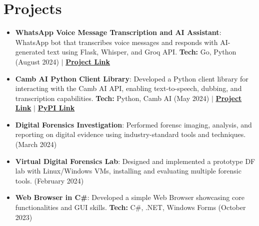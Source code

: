 \documentclass[a4paper,20pt]{article}
\newcommand{\resumeItem}[2] {
	\item\small{
		\textbf{#1}{: #2 \vspace{-2pt}}
	}
}
\newcommand{\resumeSubItem}[2]{\resumeItem{#1}{#2}\vspace{-3pt}}
\newcommand{\resumeSubHeadingListStart}{\begin{itemize}[leftmargin=*]}
\newcommand{\resumeSubHeadingListEnd}{\end{itemize}}
\begin{document}
\section{Projects}
	\resumeSubHeadingListStart
		\resumeSubItem{WhatsApp Voice Message Transcription and AI Assistant}{WhatsApp bot that transcribes voice messages and responds with AI-generated text using Flask, Whisper, and Groq API. \textbf{Tech:} Go, Python (August 2024) $\vert$ \href{https://github.com/cr2007/whatsapp-voice-ai-assistant}{\textbf{Project Link}}}
		\vspace{2pt}
		\resumeSubItem{Camb AI Python Client Library}{Developed a Python client library for interacting with the Camb AI API, enabling text-to-speech, dubbing, and transcription capabilities. \textbf{Tech:} Python, Camb AI (May 2024) $\vert$ \href{https://github.com/cr2007/cambai}{\textbf{Project Link}} $\vert$ \href{https://pypi.org/project/cambai}{\textbf{PyPI Link}}}
		\vspace{2pt}
		\resumeSubItem{Digital Forensics Investigation}{Performed forensc imaging, analysis, and reporting on digital evidence using industry-standard tools and techniques. (March 2024)}
		\vspace{2pt}
		\resumeSubItem{Virtual Digital Forensics Lab}{Designed and implemented a prototype DF lab with Linux/Windows VMs, installing and evaluating multiple forensic tools. (February 2024)}
		\vspace{2pt}
		\resumeSubItem{Web Browser in C\#}{Developed a simple Web Browser showcasing core functionalities and GUI skills. \textbf{Tech:} C\#, .NET, Windows Forms (October 2023)}
		\vspace{2pt}
	\resumeSubHeadingListEnd
\vspace{-3pt}
\end{document}
